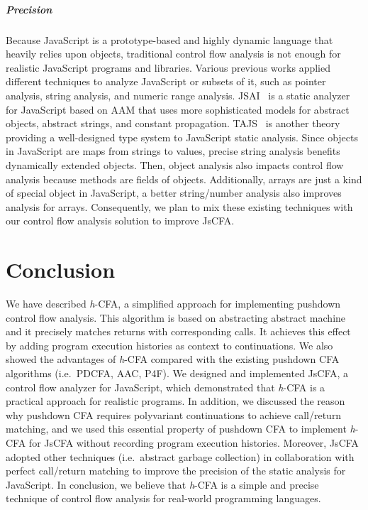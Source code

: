 \documentclass[12pt]{report}
\begin{document}
\paragraph{Precision}
Because JavaScript is a prototype-based and highly dynamic language that heavily relies upon objects,
traditional control flow analysis is not enough for realistic JavaScript programs and libraries.
Various previous works applied different techniques to analyze JavaScript or subsets of it, such as pointer analysis, string analysis, and numeric range analysis.
JSAI~\cite{kashyap2014jsai} is a static analyzer for JavaScript based on AAM that uses more sophisticated models for abstract objects, abstract strings, and constant propagation.
TAJS~\cite{jensen2009type} is another theory providing a well-designed type system to JavaScript static analysis.
Since objects in JavaScript are maps from strings to values, precise string analysis benefits dynamically extended objects.
Then, object analysis also impacts control flow analysis because methods are fields of objects.
Additionally, arrays are just a kind of special object in JavaScript, a better string/number analysis also improves analysis for arrays.
Consequently, we plan to mix these existing techniques with our control flow analysis solution to improve JsCFA\@.

\chapter{Conclusion}
\label{sec:Conclude}
We have described \textit{h}-CFA, a simplified approach for implementing pushdown control flow analysis.
This algorithm is based on abstracting abstract machine and it precisely matches returns with corresponding calls.
It achieves this effect by adding program execution histories as context to continuations.
We also showed the advantages of \textit{h}-CFA compared with the existing pushdown CFA algorithms (i.e.\ PDCFA, AAC, P4F).
We designed and implemented JsCFA, a control flow analyzer for JavaScript, which demonstrated that \textit{h}-CFA is a practical approach for realistic programs.
In addition, we discussed the reason why pushdown CFA requires polyvariant continuations to achieve call/return matching, and we used this essential property of pushdown CFA to implement \textit{h}-CFA for JsCFA without recording program execution histories.
Moreover, JsCFA adopted other techniques (i.e.\ abstract garbage collection) in collaboration with perfect call/return matching to improve the precision of the static analysis for JavaScript.
In conclusion, we believe that \textit{h}-CFA is a simple and precise technique of control flow analysis for real-world programming languages.

\clearpage


\end{document}
